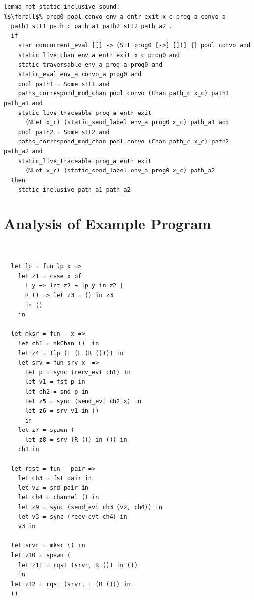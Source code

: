 \documentclass{article}
\begin{document}
\begin{lstlisting}[language=logic, escapechar=\%]
lemma not_static_inclusive_sound:
%$\forall$% prog0 pool convo env_a entr exit x_c prog_a convo_a
  path1 stt1 path_c path_a1 path2 stt2 path_a2 .
  if
    star concurrent_eval [[] -> (Stt prog0 [->] [])] {} pool convo and 
    static_live_chan env_a entr exit x_c prog0 and 
    static_traversable env_a prog_a prog0 and 
    static_eval env_a convo_a prog0 and 
    pool path1 = Some stt1 and 
    paths_correspond_mod_chan pool convo (Chan path_c x_c) path1 path_a1 and 
    static_live_traceable prog_a entr exit
      (NLet x_c) (static_send_label env_a prog0 x_c) path_a1 and 
    pool path2 = Some stt2 and 
    paths_correspond_mod_chan pool convo (Chan path_c x_c) path2 path_a2 and 
    static_live_traceable prog_a entr exit
      (NLet x_c) (static_send_label env_a prog0 x_c) path_a2
  then
    static_inclusive path_a1 path_a2

  \end{lstlisting}













\section{Analysis of Example Program}

\begin{lstlisting}[language=logic, escapechar=\%]


  let lp = fun lp x => 
    let z1 = case x of 
      L y => let z2 = lp y in z2 |
      R () => let z3 = () in z3
      in ()
    in

  let mksr = fun _ x => 
    let ch1 = mkChan ()  in
    let z4 = (lp (L (L (R ()))) in
    let srv = fun srv x  =>
      let p = sync (recv_evt ch1) in
      let v1 = fst p in
      let ch2 = snd p in 
      let z5 = sync (send_evt ch2 x) in
      let z6 = srv v1 in ()
      in
    let z7 = spawn (
      let z8 = srv (R ()) in ()) in
    ch1 in

  let rqst = fun _ pair =>
    let ch3 = fst pair in
    let v2 = snd pair in
    let ch4 = channel () in
    let z9 = sync (send_evt ch3 (v2, ch4)) in
    let v3 = sync (recv_evt ch4) in
    v3 in

  let srvr = mksr () in
  let z10 = spawn ( 
    let z11 = rqst (srvr, R ()) in ())
    in
  let z12 = rqst (srvr, L (R ())) in
  () 

  \end{lstlisting}
\end{document}
